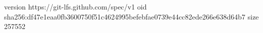 version https://git-lfs.github.com/spec/v1
oid sha256:df47e1eaa0fb3600750f51c4624995befebfae0739e44cc82ede266e638d64b7
size 257552

